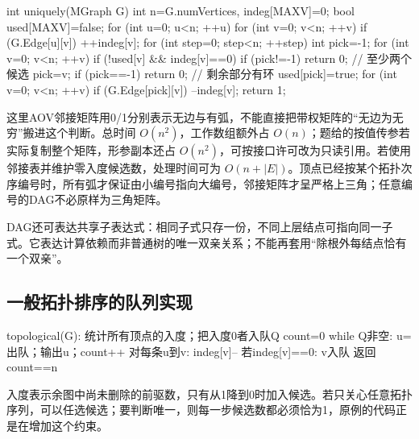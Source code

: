 \par\medskip\noindent\begin{minipage}{\linewidth}
\begin{codeblock}[language=C]
int uniquely(MGraph G) {
    int n=G.numVertices, indeg[MAXV]={0};
    bool used[MAXV]={false};
    for (int u=0; u<n; ++u)
        for (int v=0; v<n; ++v)
            if (G.Edge[u][v]) ++indeg[v];
    for (int step=0; step<n; ++step) {
        int pick=-1;
        for (int v=0; v<n; ++v)
            if (!used[v] && indeg[v]==0) {
                if (pick!=-1) return 0; // 至少两个候选
                pick=v;
            }
        if (pick==-1) return 0;         // 剩余部分有环
        used[pick]=true;
        for (int v=0; v<n; ++v)
            if (G.Edge[pick][v]) --indeg[v];
    }
    return 1;
}
\end{codeblock}
\end{minipage}\par\medskip

这里AOV邻接矩阵用0/1分别表示无边与有弧，不能直接把带权矩阵的``无边为无穷''搬进这个判断。总时间 \(O(n^2)\)，工作数组额外占 \(O(n)\)；题给的按值传参若实际复制整个矩阵，形参副本还占 \(O(n^2)\)，可按接口许可改为只读引用。若使用邻接表并维护零入度候选数，处理时间可为 \(O(n+|E|)\)。顶点已经按某个拓扑次序编号时，所有弧才保证由小编号指向大编号，邻接矩阵才呈严格上三角；任意编号的DAG不必原样为三角矩阵。

DAG还可表达共享子表达式：相同子式只存一份，不同上层结点可指向同一子式。它表达计算依赖而非普通树的唯一双亲关系；不能再套用``除根外每结点恰有一个双亲''。

\subsection{一般拓扑排序的队列实现}\label{DS06-topo-code}

\par\medskip\noindent\begin{minipage}{\linewidth}
\begin{codeblock}[language={}]
topological(G):
    统计所有顶点的入度；把入度0者入队Q
    count=0
    while Q非空:
        u=出队；输出u；count++
        对每条u到v: indeg[v]--
            若indeg[v]==0: v入队
    返回count==n
\end{codeblock}
\end{minipage}\par\medskip

入度表示余图中尚未删除的前驱数，只有从1降到0时加入候选。若只关心任意拓扑序列，可以任选候选；要判断唯一，则每一步候选数都必须恰为1，原例的代码正是在增加这个约束。


